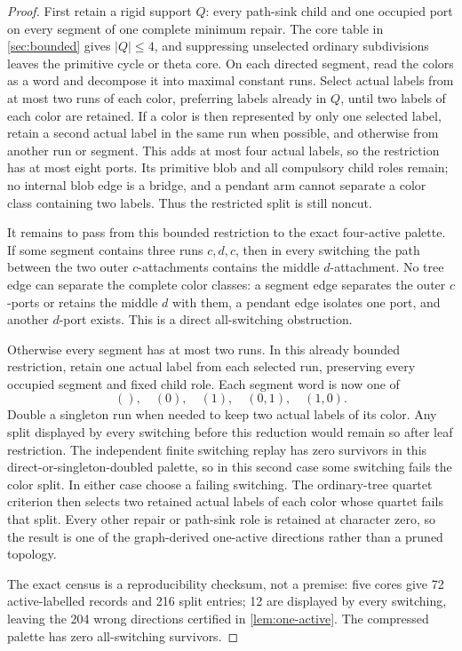 \begin{proof}
First retain a rigid support \(Q\): every path-sink child and one occupied port
on every segment of one complete minimum repair.  The core table in
\cref{sec:bounded} gives \(|Q|\le4\), and suppressing unselected ordinary
subdivisions leaves the primitive cycle or theta core.  On each directed
segment, read the colors as a word and decompose it into maximal constant
runs.  Select actual labels from at most two runs of each color, preferring
labels already in \(Q\), until two labels of each color are retained.  If a
color is then represented by only one selected label, retain a second actual
label in the same run when possible, and otherwise from another run or
segment.  This adds at most four actual labels, so the restriction has at
most eight ports.  Its primitive blob and all compulsory child roles remain;
no internal blob edge is a bridge, and a pendant arm cannot separate a color
class containing two labels.  Thus the restricted split is still noncut.

It remains to pass from this bounded restriction to the exact four-active
palette.  If some segment contains three runs \(c,d,c\), then in every
switching the path between the two outer \(c\)-attachments contains the middle
\(d\)-attachment.  No tree edge can separate the complete color classes:
a segment edge separates the outer \(c\)-ports or retains the middle \(d\) with
them, a pendant edge isolates one port, and another \(d\)-port exists.
This is a direct all-switching obstruction.

Otherwise every segment has at most two runs.  In this already bounded
restriction, retain one actual label from each selected run, preserving every
occupied segment and fixed child role.  Each segment word is now one of
\[
 (),\quad(0),\quad(1),\quad(0,1),\quad(1,0).
\]
Double a singleton run when needed to keep two actual labels of its color.
Any split displayed by every switching before this reduction would remain so
after leaf restriction.  The independent finite switching replay has zero
survivors in this direct-or-singleton-doubled palette, so in this second case
some switching fails the color split.  In either case choose a failing
switching.  The ordinary-tree quartet criterion then selects two retained
actual labels of each color whose quartet fails that split.  Every
other repair or path-sink role is retained at character zero, so the result
is one of the graph-derived one-active directions rather than a pruned
topology.

The exact census is a reproducibility checksum, not a premise: five cores
give 72 active-labelled records and 216 split entries; 12 are displayed by
every switching, leaving the 204 wrong directions certified in
\cref{lem:one-active}.  The compressed palette has zero all-switching
survivors.
\end{proof}

